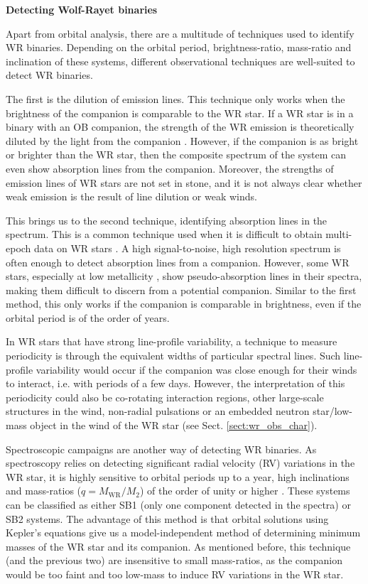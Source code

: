 \textbf{Detecting Wolf-Rayet binaries}\label{sect:detection_methods}

Apart from orbital analysis, there are a multitude of techniques used to identify WR binaries. Depending on the orbital period, brightness-ratio, mass-ratio and inclination of these systems, different observational techniques are well-suited to detect WR binaries. 

The first is the dilution of emission lines. This technique only works when the brightness of the companion is comparable to the WR star. If a WR star is in a binary with an OB companion, the strength of the WR emission is theoretically diluted by the light from the companion \citep{1968aSmith,1989ContiMassey,2007Crowther}. However, if the companion is as bright or brighter than the WR star, then the composite spectrum of the system can even show absorption lines from the companion. Moreover, the strengths of emission lines of WR stars are not set in stone, and it is not always clear whether weak emission is the result of line dilution or weak winds.

This brings us to the second technique, identifying absorption lines in the spectrum. This is a common technique used when it is difficult to obtain multi-epoch data on WR stars \citep[e.g.,][]{1989ContiMassey}. A high signal-to-noise, high resolution spectrum is often enough to detect absorption lines from a companion. However, some WR stars, especially at low metallicity \citep[e.g.,][]{hainich_wolf-rayet_2015}, show pseudo-absorption lines in their spectra, making them difficult to discern from a potential companion. Similar to the first method, this only works if the companion is comparable in brightness, even if the orbital period is of the order of years. 

In WR stars that have strong line-profile variability, a technique to measure periodicity is through the equivalent widths of particular spectral lines. Such line-profile variability would occur if the companion was close enough for their winds to interact, i.e. with periods of a few days. However, the interpretation of this periodicity could also be co-rotating interaction regions, other large-scale structures in the wind, non-radial pulsations or an embedded neutron star/low-mass object in the wind of the WR star (see Sect. \ref{sect:wr_obs_char}). 

Spectroscopic campaigns are another way of detecting WR binaries. As spectroscopy relies on detecting significant radial velocity (RV) variations in the WR star, it is highly sensitive to orbital periods up to a year, high inclinations and mass-ratios ($q=M_\textrm{WR}/M_2$) of the order of unity or higher \citep[see e.g.,][]{1998Marchenko1998WR141,2012David-Uraz,2021Richardson}. These systems can be classified as either SB1 (only one component detected in the spectra) or SB2 systems. The advantage of this method is that orbital solutions using Kepler's equations give us a model-independent method of determining minimum masses of the WR star and its companion. As mentioned before, this technique (and the previous two) are insensitive to small mass-ratios, as the companion would be too faint and too low-mass to induce RV variations in the WR star. 

